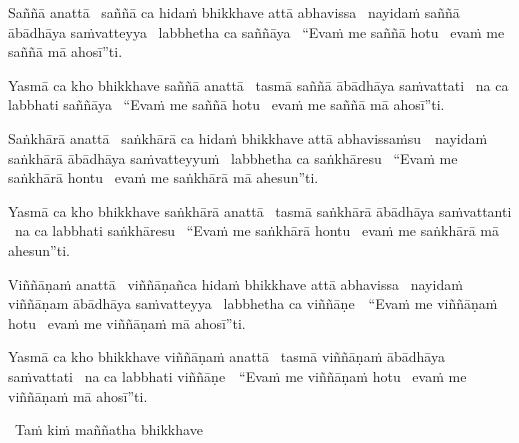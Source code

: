\begin{pali-hang}
  Saññā anattā \breathmark\ saññā ca hidaṁ bhikkhave attā abhavissa \breathmark\ nayidaṁ saññā ābādhāya saṁvatteyya \breathmark\ labbhetha ca saññāya \breathmark\ ``Evaṁ me saññā hotu \breathmark\ evaṁ me saññā mā ahosī''ti.
\end{pali-hang}
\begin{pali-hangtogether}
\end{pali-hangtogether}
  Yasmā ca kho bhikkhave saññā anattā \breathmark\ tasmā saññā ābādhāya saṁvattati \breathmark\ na ca labbhati saññāya \breathmark\ ``Evaṁ me saññā hotu \breathmark\ evaṁ me saññā mā ahosī''ti.

\begin{pali-hang}
  Saṅkhārā anattā \breathmark\ saṅkhārā ca hidaṁ bhikkhave attā \mbox{abhavissaṁsu}~\breathmark\ nayidaṁ saṅkhārā ābādhāya saṁvatteyyuṁ \breathmark\ labbhetha ca saṅkhāresu \breathmark\ ``Evaṁ me saṅkhārā hontu \breathmark\ evaṁ me saṅkhārā mā ahesun''ti.
\end{pali-hang}
\begin{pali-hangtogether}
  Yasmā ca kho bhikkhave saṅkhārā anattā \breathmark\ tasmā saṅkhārā ābādhāya saṁvattanti \breathmark\ na ca labbhati saṅkhāresu \breathmark\ ``Evaṁ me saṅkhārā hontu \breathmark\ evaṁ me saṅkhārā mā ahesun''ti.
\end{pali-hangtogether}

\begin{pali-hang}
  Viññāṇaṁ anattā \breathmark\ viññāṇañca hidaṁ bhikkhave attā abhavissa \breathmark\ nayidaṁ viññāṇam ābādhāya saṁvatteyya \breathmark\ labbhetha ca \mbox{viññāṇe}~\breathmark\ ``Evaṁ me viññāṇaṁ hotu \breathmark\ evaṁ me viññāṇaṁ mā ahosī''ti.
\end{pali-hang}
\begin{pali-hangtogether}
  Yasmā ca kho bhikkhave viññāṇaṁ anattā \breathmark\ tasmā viññāṇaṁ ābādhāya saṁvattati \breathmark\ na ca labbhati \mbox{viññāṇe}~\breathmark\ ``Evaṁ me viññāṇaṁ hotu \breathmark\ evaṁ me viññāṇaṁ mā ahosī''ti.
\end{pali-hangtogether}

\begin{leader-only}
  \anglebracketleft\ \hspace{-0.5mm}Taṁ kiṁ maññatha bhikkhave \hspace{-0.5mm}\anglebracketright\
\end{leader-only}

\vspace{-0.99em} %

